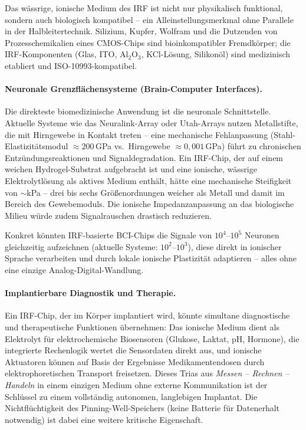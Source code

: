 ﻿\documentclass[a4paper,12pt]{scrreprt}
\theoremstyle{definition}
\begin{document}
Das wässrige, ionische Medium des IRF ist nicht nur physikalisch funktional,
sondern auch biologisch kompatibel -- ein Alleinstellungsmerkmal ohne
Parallele in der Halbleitertechnik. Silizium, Kupfer, Wolfram und die
Dutzenden von Prozesschemikalien eines CMOS-Chips sind bioinkompatibler
Fremdkörper; die IRF-Komponenten (Glas, ITO, Al$_2$O$_3$, KCl-Lösung,
Silikonöl) sind medizinisch etabliert und ISO-10993-kompatibel.

\paragraph{Neuronale Grenzflächensysteme (Brain-Computer Interfaces).}
Die direkteste biomedizinische Anwendung ist die neuronale Schnittstelle.
Aktuelle Systeme wie das Neuralink-Array oder Utah-Arrays nutzen Metallstifte,
die mit Hirngewebe in Kontakt treten -- eine mechanische Fehlanpassung
(Stahl-Elastizitätsmodul $\approx 200$\,GPa vs.\ Hirngewebe $\approx 0{,}001$\,GPa)
führt zu chronischen Entzündungsreaktionen und Signaldegradation.
Ein IRF-Chip, der auf einem weichen Hydrogel-Substrat aufgebracht ist und
eine ionische, wässrige Elektrolytlösung als aktives Medium enthält,
hätte eine mechanische Steifigkeit von $\sim$kPa -- drei bis sechs
Größenordnungen weicher als Metall und damit im Bereich des Gewebemoduls.
Die ionische Impedanzanpassung an das biologische Milieu würde zudem
Signalrauschen drastisch reduzieren.

Konkret könnten IRF-basierte BCI-Chips die Signale von
$10^4$--$10^5$ Neuronen gleichzeitig aufzeichnen (aktuelle Systeme:
$10^2$--$10^3$), diese direkt in ionischer Sprache verarbeiten
und durch lokale ionische Plastizität adaptieren -- alles ohne eine
einzige Analog-Digital-Wandlung.

\paragraph{Implantierbare Diagnostik und Therapie.}
Ein IRF-Chip, der im Körper implantiert wird, könnte simultane diagnostische
und therapeutische Funktionen übernehmen: Das ionische Medium dient als
Elektrolyt für elektrochemische Biosensoren (Glukose, Laktat, pH, Hormone),
die integrierte Rechenlogik wertet die Sensordaten direkt aus, und
ionische Aktuatoren können auf Basis der Ergebnisse Medikamentendosen
durch elektrophoretischen Transport freisetzen. Dieses Trias
aus \emph{Messen -- Rechnen -- Handeln} in einem einzigen Medium ohne
externe Kommunikation ist der Schlüssel zu einem vollständig autonomen,
langlebigen Implantat. Die Nichtflüchtigkeit des Pinning-Well-Speichers
(keine Batterie für Datenerhalt notwendig) ist dabei eine weitere
kritische Eigenschaft.
\end{document}
